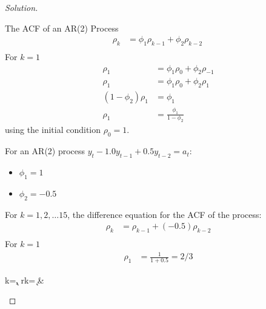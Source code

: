 \documentclass[UTF8,a4paper,14pt]{ctexart}
\newenvironment{solution}
  {\renewcommand\qedsymbol{$\blacksquare$}\begin{proof}[Solution]}
  {\end{proof}}
\theoremstyle{definition}
\theoremstyle{remark}
\begin{document}
\begin{solution}
\begin{mybox}{The ACF of an AR(2) Process}
\begin{equation}
\begin{aligned}
    \rho_k &=\phi_1 \rho_{k-1}+\phi_2 \rho_{k-2}\\
  \end{aligned}
  \end{equation}
  For \(k = 1\)
  \begin{equation}\
    \begin{aligned}
      \rho_{1} &= \phi_1\rho_{0}+\phi_2 \rho_{-1}\\
      \rho_{1} &= \phi_1\rho_{0}+\phi_2 \rho_{1}\\
      (1-\phi_2)\rho_{1}  &=\phi_1   \\
      \rho_{1}&=\frac{\phi_1}{1-\phi_2}
    \end{aligned}
  \end{equation}
  using the initial condition \(\rho_{0} = 1\).\\
  \end{mybox}
  \pagebreak\noindent
  For an AR(2) process \(y_t -1.0 y_{t-1} +0.5 y_{t-2} = a_{t}\):
  \begin{itemize}
    \item \(\phi_1 = 1\)
    \item \(\phi_2 = -0.5\)
  \end{itemize}
  For \(k = 1,2,\ldots 15\), the difference equation for the ACF of the process:
  \begin{equation}\
    \begin{aligned}
      \rho_k &= \rho_{k-1}+(-0.5)\rho_{k-2}\\
    \end{aligned}
    \end{equation}
  For \(k = 1\)
  \begin{equation}\
    \begin{aligned}
      \rho_{1}&=\frac{1}{1+0.5}=2/3
    \end{aligned}
  \end{equation}

  \begin{center}
    \csvreader[
tabular = |r|l|,
table head = \hline k & \(\rho_k\)\\\hline\hline,
late after line = \\\hline
]{Q2.csv}
{k=\k, rk=\rk}{%
\k & \rk}%
  \end{center}

  
\end{solution}
\end{document}
